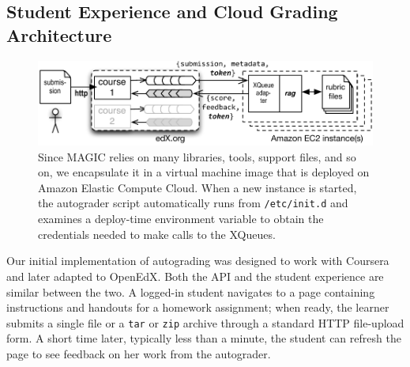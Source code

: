 \subsection{Student Experience and Cloud Grading Architecture}

\begin{figure}
  \centering
  \includegraphics[width=\textwidth]{figs/autograder_arch.pdf}
  \caption{\label{fig:autograder_arch}
  Since MAGIC relies on many libraries,
  tools, support files, and so on, we encapsulate it in a
  virtual machine image that is deployed on Amazon Elastic Compute Cloud.
  When a new instance is started, the autograder script automatically runs from
  \texttt{/etc/init.d} and examines a deploy-time environment variable
  to obtain the credentials needed to make calls to the XQueues.}
\end{figure}


Our initial implementation of autograding was designed to work with
Coursera and later adapted to OpenEdX.  Both the API and the student
experience are similar 
between the two.  A logged-in student navigates to a page
containing instructions and handouts for a homework assignment;
when ready, the learner submits a single file or a
\texttt{tar} or \texttt{zip} archive through a standard HTTP
file-upload form.  A short time later, typically less than a minute, the
student can refresh the page to see feedback on her work from the
autograder.  

